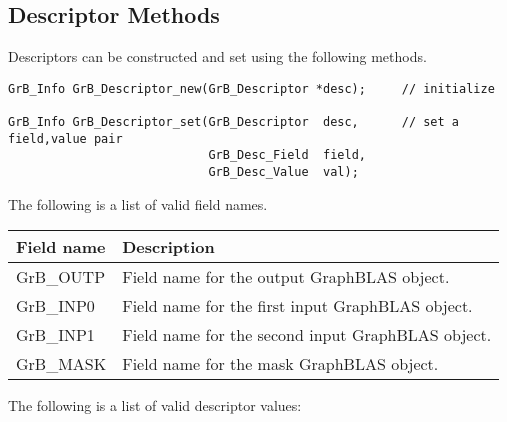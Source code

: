 \documentclass[11pt]{article}
\begin{document}
\subsection{Descriptor Methods}

Descriptors can be constructed and set using the following methods.

\begin{verbatim}
GrB_Info GrB_Descriptor_new(GrB_Descriptor *desc);     // initialize

GrB_Info GrB_Descriptor_set(GrB_Descriptor  desc,      // set a field,value pair
                            GrB_Desc_Field  field,
                            GrB_Desc_Value  val);
\end{verbatim}

The following is a list of valid field names.             

\begin{tabular}{l|l} \hline
Field name          & Description \\ \hline
{\sf GrB\_OUTP} &  Field name for the output GraphBLAS object. \\
{\sf GrB\_INP0}   &  Field name for the first input GraphBLAS object. \\
{\sf GrB\_INP1}   &  Field name for the second input  GraphBLAS object. \\
{\sf GrB\_MASK} &  Field name for the mask GraphBLAS object. \\ \hline
\end{tabular}

The following is a list of valid descriptor values:
\end{document}

